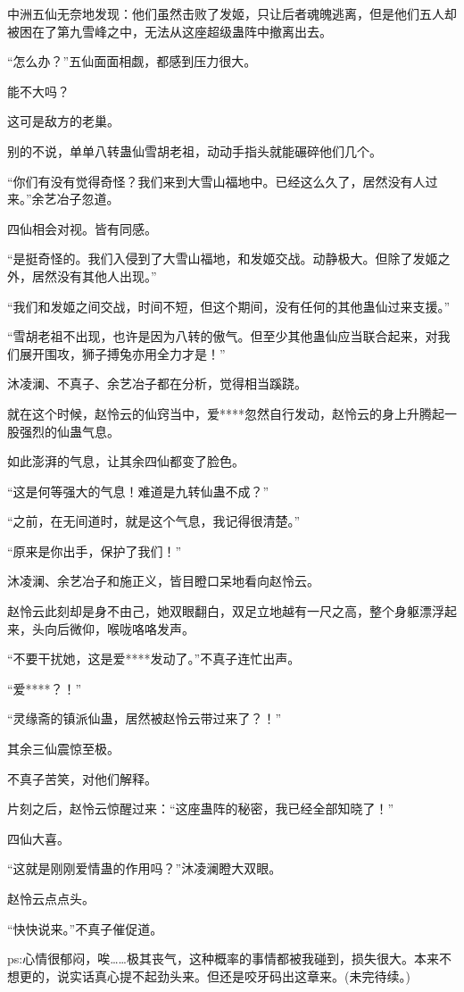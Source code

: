 \begin{this_body}
中洲五仙无奈地发现：他们虽然击败了发姬，只让后者魂魄逃离，但是他们五人却被困在了第九雪峰之中，无法从这座超级蛊阵中撤离出去。

“怎么办？”五仙面面相觑，都感到压力很大。

能不大吗？

这可是敌方的老巢。

别的不说，单单八转蛊仙雪胡老祖，动动手指头就能碾碎他们几个。

“你们有没有觉得奇怪？我们来到大雪山福地中。已经这么久了，居然没有人过来。”余艺冶子忽道。

四仙相会对视。皆有同感。

“是挺奇怪的。我们入侵到了大雪山福地，和发姬交战。动静极大。但除了发姬之外，居然没有其他人出现。”

“我们和发姬之间交战，时间不短，但这个期间，没有任何的其他蛊仙过来支援。”

“雪胡老祖不出现，也许是因为八转的傲气。但至少其他蛊仙应当联合起来，对我们展开围攻，狮子搏兔亦用全力才是！”

沐凌澜、不真子、余艺冶子都在分析，觉得相当蹊跷。

就在这个时候，赵怜云的仙窍当中，爱****忽然自行发动，赵怜云的身上升腾起一股强烈的仙蛊气息。

如此澎湃的气息，让其余四仙都变了脸色。

“这是何等强大的气息！难道是九转仙蛊不成？”

“之前，在无间道时，就是这个气息，我记得很清楚。”

“原来是你出手，保护了我们！”

沐凌澜、余艺冶子和施正义，皆目瞪口呆地看向赵怜云。

赵怜云此刻却是身不由己，她双眼翻白，双足立地越有一尺之高，整个身躯漂浮起来，头向后微仰，喉咙咯咯发声。

“不要干扰她，这是爱****发动了。”不真子连忙出声。

“爱****？！”

“灵缘斋的镇派仙蛊，居然被赵怜云带过来了？！”

其余三仙震惊至极。

不真子苦笑，对他们解释。

片刻之后，赵怜云惊醒过来：“这座蛊阵的秘密，我已经全部知晓了！”

四仙大喜。

“这就是刚刚爱情蛊的作用吗？”沐凌澜瞪大双眼。

赵怜云点点头。

“快快说来。”不真子催促道。

ps:心情很郁闷，唉……极其丧气，这种概率的事情都被我碰到，损失很大。本来不想更的，说实话真心提不起劲头来。但还是咬牙码出这章来。(未完待续。)

\end{this_body}

